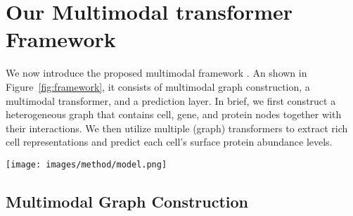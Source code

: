 \section{Our Multimodal transformer Framework}

We now introduce the proposed multimodal framework \method{}. An shown in Figure~\ref{fig:framework}, it consists of multimodal graph construction, a multimodal transformer, and a prediction layer. In brief, we first construct a heterogeneous graph that contains cell, gene, and protein nodes together with their interactions. We then utilize multiple (graph) transformers to extract rich cell representations and predict each cell's surface protein abundance levels. %

\begin{figure*}[t]
    \centering
    \vspace{-1em}
    \texttt{[image: images/method/model.png]}
    \vspace{-1.5em}
    \caption{An illustration of \method{}. In this framework, three important components are included: graph construction, multimodal transformer, and prediction layer.}
    \label{fig:framework}
    \vspace{-1.5em}
\end{figure*}


\vspace{-0.4em}
\subsection{Multimodal Graph Construction}
\label{sec:graph_const}

